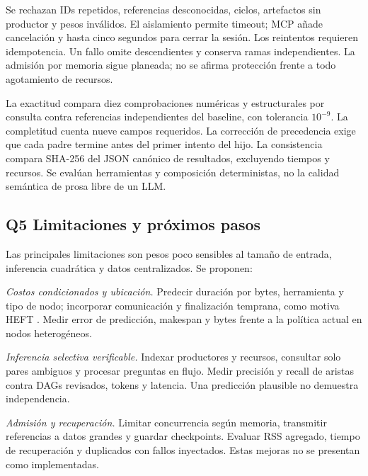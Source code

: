 Se rechazan IDs repetidos, referencias desconocidas, ciclos, artefactos
sin productor y pesos inválidos. El aislamiento permite timeout;
MCP añade cancelación y hasta cinco segundos para cerrar la sesión.
Los reintentos requieren idempotencia. Un fallo omite descendientes y
conserva ramas independientes. La admisión por memoria sigue planeada;
no se afirma protección frente a todo agotamiento de recursos.

La exactitud compara diez comprobaciones numéricas y estructurales
por consulta contra referencias independientes del baseline, con
tolerancia $10^{-9}$. La completitud cuenta nueve campos requeridos.
La corrección de precedencia exige que cada padre termine antes del
primer intento del hijo. La consistencia compara SHA-256 del JSON
canónico de resultados, excluyendo tiempos y recursos. Se evalúan
herramientas y composición deterministas, no la calidad semántica
de prosa libre de un LLM.

\subsection{Q5 Limitaciones y próximos pasos}
Las principales limitaciones son pesos poco sensibles al tamaño de
entrada, inferencia cuadrática y datos centralizados. Se proponen:

\textit{Costos condicionados y ubicación.} Predecir duración por bytes,
herramienta y tipo de nodo; incorporar comunicación y finalización
temprana, como motiva HEFT \cite{heft}. Medir error de predicción,
makespan y bytes frente a la política actual en nodos heterogéneos.

\textit{Inferencia selectiva verificable.} Indexar productores y recursos,
consultar solo pares ambiguos y procesar preguntas en flujo. Medir
precisión y recall de aristas contra DAGs revisados, tokens y latencia.
Una predicción plausible no demuestra independencia.

\textit{Admisión y recuperación.} Limitar concurrencia según memoria,
transmitir referencias a datos grandes y guardar checkpoints. Evaluar
RSS agregado, tiempo de recuperación y duplicados con fallos inyectados.
Estas mejoras no se presentan como implementadas.
